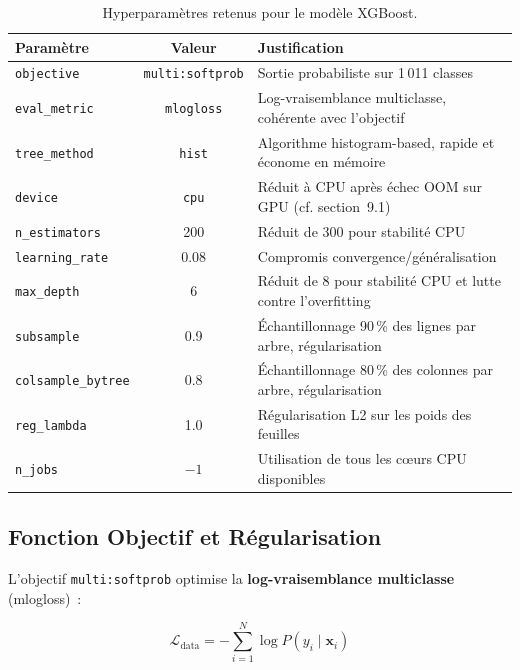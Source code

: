 \documentclass[11pt, a4paper]{article}
\begin{document}
\begin{table}[h]
\centering
\small
\begin{tabularx}{\textwidth}{|l|c|X|}
\hline
\textbf{Paramètre}      & \textbf{Valeur}        & \textbf{Justification} \\
\hline
\texttt{objective}      & \texttt{multi:softprob} & Sortie probabiliste sur 1\,011 classes \\
\hline
\texttt{eval\_metric}   & \texttt{mlogloss}       & Log-vraisemblance multiclasse, cohérente avec l'objectif \\
\hline
\texttt{tree\_method}   & \texttt{hist}           & Algorithme histogram-based, rapide et économe en mémoire \\
\hline
\texttt{device}         & \texttt{cpu}            & Réduit à CPU après échec OOM sur GPU (cf. section~9.1) \\
\hline
\texttt{n\_estimators}  & 200                     & Réduit de 300 pour stabilité CPU \\
\hline
\texttt{learning\_rate} & 0.08                    & Compromis convergence/généralisation \\
\hline
\texttt{max\_depth}     & 6                       & Réduit de 8 pour stabilité CPU et lutte contre l'overfitting \\
\hline
\texttt{subsample}      & 0.9                     & Échantillonnage 90\,\% des lignes par arbre, régularisation \\
\hline
\texttt{colsample\_bytree} & 0.8                  & Échantillonnage 80\,\% des colonnes par arbre, régularisation \\
\hline
\texttt{reg\_lambda}    & 1.0                     & Régularisation L2 sur les poids des feuilles \\
\hline
\texttt{n\_jobs}        & $-1$                    & Utilisation de tous les cœurs CPU disponibles \\
\hline
\end{tabularx}
\caption{Hyperparamètres retenus pour le modèle XGBoost.}
\end{table}

\subsection{Fonction Objectif et Régularisation}

L'objectif \texttt{multi:softprob} optimise la
\textbf{log-vraisemblance multiclasse} (mlogloss)~:

\[
\mathcal{L}_{\text{data}} = -\sum_{i=1}^{N} \log P(y_i \mid \mathbf{x}_i)
\]
\end{document}
